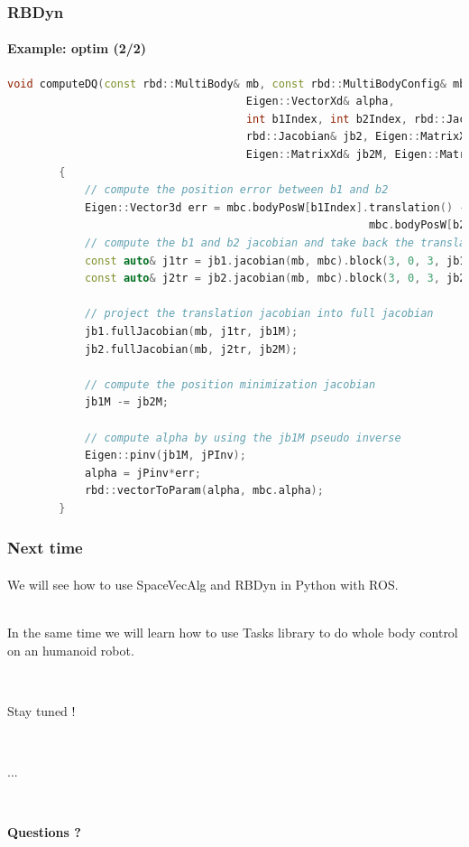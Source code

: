 \documentclass{beamer}
\begin{document}
\begin{frame}[fragile]
	\frametitle{RBDyn}
	\framesubtitle{Example: optim (2/2)}
	\begin{lstlisting}[language=C++,basicstyle=\tiny]
		void computeDQ(const rbd::MultiBody& mb, const rbd::MultiBodyConfig& mbc,
									 Eigen::VectorXd& alpha,
									 int b1Index, int b2Index, rbd::Jacobian& jb1,
									 rbd::Jacobian& jb2, Eigen::MatrixXd& jb1M,
									 Eigen::MatrixXd& jb2M, Eigen::MatrixXd& jPInv)
		{
			// compute the position error between b1 and b2
			Eigen::Vector3d err = mbc.bodyPosW[b1Index].translation() -
														mbc.bodyPosW[b2Index].translation();
			// compute the b1 and b2 jacobian and take back the translation part
			const auto& j1tr = jb1.jacobian(mb, mbc).block(3, 0, 3, jb1.dof());
			const auto& j2tr = jb2.jacobian(mb, mbc).block(3, 0, 3, jb2.dof());

			// project the translation jacobian into full jacobian
			jb1.fullJacobian(mb, j1tr, jb1M);
			jb2.fullJacobian(mb, j2tr, jb2M);

			// compute the position minimization jacobian
			jb1M -= jb2M;

			// compute alpha by using the jb1M pseudo inverse
			Eigen::pinv(jb1M, jPInv);
			alpha = jPinv*err;
			rbd::vectorToParam(alpha, mbc.alpha);
		}
	\end{lstlisting}
\end{frame}

\begin{frame}
	\frametitle{Next time}
	\framesubtitle{}
	We will see how to use SpaceVecAlg and RBDyn in Python with ROS.
	
	\hfill \\
	In the same time we will learn how to use Tasks library to do whole body control on an humanoid robot.

	\hfill \\
	{\centering
	Stay tuned !\par}
	\hfil \\
	{\centering
	...\par}
	\hfill \\
	{\centering
	\bf{Questions} ?\par}
\end{frame}
\end{document}
